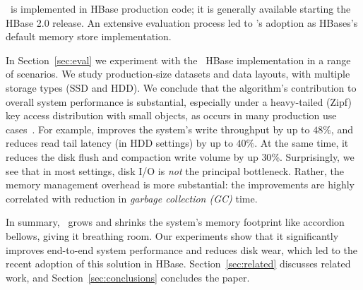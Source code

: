 \sys\ is implemented in HBase production code; it is generally available starting the HBase 2.0 release. 
An extensive evaluation process led to \sys's adoption as HBases's default memory store implementation. 

In Section~\ref{sec:eval} we experiment with the \sys\ HBase implementation in a range of scenarios.
We study production-size datasets and data layouts, with multiple storage types (SSD and HDD). 
We conclude that the algorithm's contribution to overall system performance is substantial, 
especially under a  heavy-tailed (Zipf) key access distribution with 
small objects, as occurs in many production use cases~\cite{Wu2015}. For example, \sys\/ 
improves the system's write throughput by up to $48\%$, and reduces read tail latency 
(in HDD settings) by up to $40\%$. At the same time, it reduces the disk flush and compaction write volume by up $30$\%. 
Surprisingly, we see that in most settings, disk I/O is \emph{not} the principal bottleneck. Rather, the memory management 
overhead is more substantial: the improvements are highly correlated with  reduction in \emph{garbage collection (GC)} time. 

In summary, \sys\ grows and shrinks the system's memory footprint like accordion bellows, giving it breathing 
room. Our experiments show that it significantly improves end-to-end system performance and reduces disk wear, 
which led to the recent adoption of this solution in HBase. Section~\ref{sec:related} discusses related work, 
and Section~\ref{sec:conclusions} concludes the paper.

